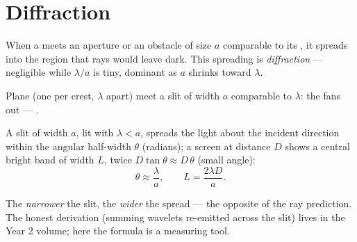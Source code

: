 \section{Diffraction}

\begin{definition}[Diffraction]\label{def:g12:light-as-wave:diffraction}
When a  meets an aperture or an obstacle of size $a$ comparable to
its , it spreads into the region that rays would leave dark.
This spreading is \emph{diffraction} --- negligible
while $\lambda/a$ is tiny, dominant as $a$ shrinks toward $\lambda$.
\end{definition}

\begin{omfigure}

{\small Plane  (one per crest, $\lambda$ apart) meet a slit
of width $a$ comparable to $\lambda$: the  fans out --- .}
\end{omfigure}

\begin{proposition}\label{prop:g12:light-as-wave:halfwidth}
A slit of width $a$, lit with  $\lambda < a$, spreads the
light about the incident direction within the angular half-width
$\theta$ (radians); a screen at distance $D$ shows a central bright
band of width $L$, twice $D \tan\theta \approx D\,\theta$ (small
angle):
\[
\theta \approx \frac{\lambda}{a}, \qquad L = \frac{2\lambda D}{a}.
\]
\end{proposition}
\admitted

\begin{remark}\label{rem:g12:light-as-wave:honest}
The \emph{narrower} the slit, the \emph{wider} the spread --- the
opposite of the ray prediction. The honest derivation (summing
wavelets re-emitted across the slit) lives in the Year 2 volume; here
the formula is a measuring tool.
\end{remark}

